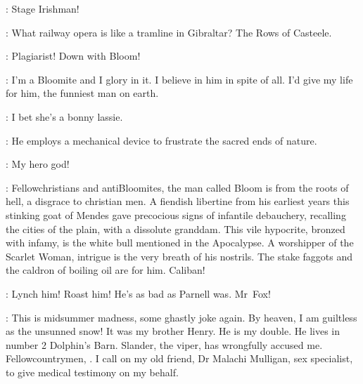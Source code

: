 \PaddyLeonard:
Stage Irishman!

\Bloom:
What railway opera is like a tramline in Gibraltar?
The Rows of Casteele.

\Lenehan:
Plagiarist!
Down with Bloom!

\VeiledSibyl:
I'm a Bloomite and I glory in it.
I believe in him in spite of all.
I'd give my life for him, the funniest man on earth.

\Bloom:
I bet she's a bonny lassie.

\TheodorePurefoy:
He employs a mechanical device to frustrate the sacred ends of nature.

\VeiledSibyl:
My hero god!


\Dowie:
Fellowchristians and antiBloomites,
the man called Bloom is from the roots of hell,
a disgrace to christian men.
A fiendish libertine from his earliest years
this stinking goat of Mendes
gave precocious signs of infantile debauchery,
recalling the cities of the plain, with a dissolute granddam.
This vile hypocrite, bronzed with infamy,
is the white bull mentioned in the Apocalypse.
A worshipper of the Scarlet Woman, intrigue is the very breath of his nostrils.
The stake faggots and the caldron of boiling oil are for him.
Caliban!

\Mob:
Lynch him!
Roast him!
He's as bad as Parnell was.
Mr~Fox!


\Bloom:
This is midsummer madness, some ghastly joke again.
By heaven, I am guiltless as the unsunned snow!
It was my brother Henry.
He is my double.
He lives in number 2 Dolphin's Barn.
Slander, the viper, has wrongfully accused me.
Fellowcountrymen, .
I call on my old friend, Dr Malachi Mulligan, sex specialist,
to give medical testimony on my behalf.

